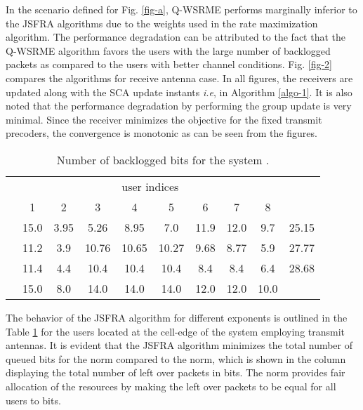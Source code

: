 In the scenario defined for Fig. \ref{fig-a}, \ac{Q-WSRME} performs marginally inferior to the \ac{JSFRA} algorithms due to the weights used in the rate maximization algorithm. The performance degradation can be attributed to the fact that the \ac{Q-WSRME} algorithm favors the users with the large number of backlogged packets as compared to the users with better channel conditions. Fig. \ref{fig-2} compares the algorithms for  receive antenna case. In all figures, the receivers are updated along with the \ac{SCA} update instants \textit{i.e},  in Algorithm \ref{algo-1}. It is also noted that the performance degradation by performing the group update is very minimal. Since the receiver minimizes the objective for the fixed transmit precoders, the convergence is monotonic as can be seen from the figures.
\begin{table}
	\centering
	\caption{Number of backlogged bits for the system .}
	\renewcommand{\arraystretch}{1.25} \scriptsize
	\begin{tabular}{|c|*{8}{c}|c|}
		\hline
		\multirow{2}{*}{\me{q}} & \multicolumn{8}{c|}{user indices} & \multirow{2}{*}{\me{\chi}} \\
		\cline{2-9}
		& 1 & 2 & 3 & 4 & 5 & 6 & 7 & 8 & \\
		\hline
		\hline
		\me{1} & 15.0 & 3.95 & 5.26 & 8.95 & 7.0 & 11.9 & 12.0 & 9.7 & 25.15 \\
		\me{2} & 11.2 & 3.9 & 10.76 & 10.65 & 10.27 & 9.68 & 8.77 & 5.9 & 27.77 \\
		\me{\infty} & 11.4 & 4.4 & 10.4 & 10.4 & 10.4 & 8.4 &  8.4 &  6.4 & 28.68 \\
		\hline
		\me{Q_k}  & 15.0 &  8.0 &  14.0 & 14.0 &  14.0 & 12.0 & 12.0 & 10.0  \\
		\cline{1-9}
	\end{tabular}
	\label{tbl-3} \vspace{-0.2in}
\end{table}

The behavior of the \ac{JSFRA} algorithm for different exponents  is outlined in the Table \ref{tbl-3} for the users located at the cell-edge of the system employing  transmit antennas. It is evident that the \ac{JSFRA} algorithm minimizes the total number of queued bits for the  norm compared to the  norm, which is shown in the column displaying the total number of left over packets \me{\chi} in bits. The \me{\ell_{\infty}} norm provides fair allocation of the resources by making the left over packets to be equal for all users to  bits.
